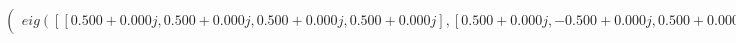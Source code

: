 \documentclass[border=1em]{standalone}
\begin{document}
$
\left(
\begin{array}{cccc}
eig([[0.500+0.000j, 0.500+0.000j, 0.500+0.000j, 0.500+0.000j],[0.500+0.000j, -0.500+0.000j, 0.500+0.000j, -0.500+0.000j],[0.500+0.000j, 0.500+0.000j, -0.500+0.000j, -0.500+0.000j],[0.500+0.000j, -0.500+0.000j, -0.500+0.000j, 0.500+0.000j]])
\end{array}
\right)
$
\end{document}
